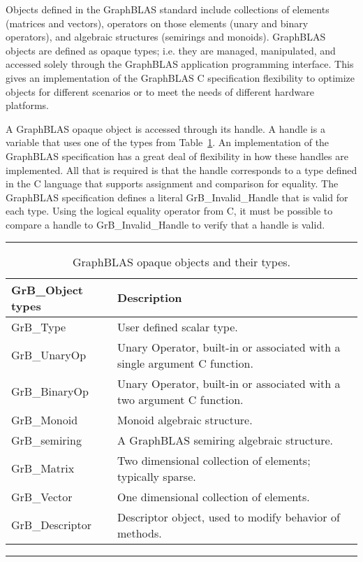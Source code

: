 Objects defined in the GraphBLAS standard include collections of elements
(matrices and vectors), operators on those elements (unary and binary operators), and 
algebraic structures (semirings and monoids).   GraphBLAS objects are defined
as opaque types; i.e. they are managed, manipulated, and accessed solely through the
GraphBLAS application programming interface. This gives an implementation of the
GraphBLAS C specification flexibility to optimize objects for different scenarios or to meet
the needs of different hardware platforms.

A GraphBLAS opaque object is accessed through its handle.  A handle
is a variable that uses one of the types from Table~\ref{Tab:ObjTypes}.  An implementation 
of the GraphBLAS specification has a great deal of flexibility in how these
handles are implemented.  All that is required is that the handle corresponds to a type defined in the 
C language that supports assignment and comparison for equality.  The
GraphBLAS specification defines a 
literal {\sf GrB\_Invalid\_Handle} that is valid for each type.  Using the logical equality 
operator from C, it must be possible to compare a handle to {\sf GrB\_Invalid\_Handle}
to verify that a handle is valid.


\begin{table}
\hrule
\begin{center}
\caption{GraphBLAS opaque objects and their types.}
\label{Tab:ObjTypes}
\begin{tabular}{l|l}
{\sf GrB\_Object types} & Description \\
\hline
{\sf GrB\_Type}           & User defined scalar type.     \\
{\sf GrB\_UnaryOp}    & Unary Operator,  built-in or associated with a single argument C function.     \\
{\sf GrB\_BinaryOp}    & Unary Operator, built-in or associated with a two argument C function.     \\
{\sf GrB\_Monoid}       & Monoid algebraic structure.     \\
{\sf GrB\_semiring}      & A GraphBLAS semiring algebraic structure.     \\
{\sf GrB\_Matrix}          & Two dimensional collection of elements; typically sparse.    \\
{\sf GrB\_Vector}         & One dimensional collection of elements.     \\
{\sf GrB\_Descriptor}    & Descriptor object, used to modify behavior of methods.     \\
\end{tabular}
\end{center}
\hrule
\end{table}

